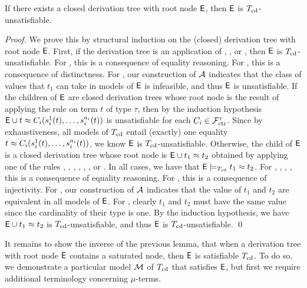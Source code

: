 \begin{lemma}%
\label{lem:rs}%
\afterDot
If there exists a closed derivation tree with root node $\mathsf{E}$, then $\mathsf{E}$ is $T_{\mathrm{cd}}$-unsatisfiable.
\end{lemma}
\begin{proof}
We prove this by structural induction on the (closed) derivation tree with root node $\mathsf{E}$.
First, if the derivation tree is an application of , , or ,
then $\mathsf{E}$ is $T_{\mathrm{cd}}$-unsatisfiable.
For , this is a consequence of equality reasoning.
For , this is a consequence of distinctness.
For , our construction of $\mathcal{A}$ indicates that the class of values that $t_1$ can take in models of $\mathsf{E}$ is infeasible,
and thus $\mathsf{E}$ is unsatisfiable.
If the children of $\mathsf{E}$ are closed derivation trees 
whose root node is the result of applying the rule  on term $t$ of type $\tau$,
then by the induction hypothesis $\mathsf{E} \cup t \approx C_i( s^1_i( t ), \ldots, s^{a_i}_i( t ) )$ is unsatisfiable
for each $C_i \in \mathcal{F}_{\mathrm{ctr}}^\tau$.
Since by exhaustiveness, all models of $T_{\mathrm{cd}}$ entail (exactly) one equality $t \approx C_i( s^1_i( t ), \ldots, s^{a_i}_i( t ) )$,
we know $\mathsf{E}$ is $T_{\mathrm{cd}}$-unsatisfiable.
Otherwise, the child of $\mathsf{E}$ is a closed derivation tree 
whose root node is $\mathsf{E} \cup t_1 \approx t_2$ obtained by applying one of the rules , , , , , , or .
In all cases, we have that $\mathsf{E} \models_{T_{\mathrm{cd}}} t_1 \approx t_2$.
For , , , , this is a consequence of equality reasoning.
For , this is a consequence of injectivity.
For , our construction of $\mathcal{A}$ indicates that the value of $t_1$ and $t_2$ are equivalent in all models of $\mathsf{E}$.
For , clearly $t_1$ and $t_2$ must have the same value since the cardinality of their type is one.
By the induction hypothesis, we have $\mathsf{E} \cup t_1 \approx t_2$ is $T_{\mathrm{cd}}$-unsatisfiable, 
and thus $\mathsf{E}$ is $T_{\mathrm{cd}}$-unsatisfiable.
\qed
\end{proof}

It remains to show the inverse of the previous lemma, that when a derivation tree with root node $\mathsf{E}$ contains a saturated node,
then $\mathsf{E}$ is satisfiable $T_{\mathrm{cd}}$.
To do so, we demonstrate a particular model $\mathcal{M}$ of $T_{\mathrm{cd}}$ that satisfies $\mathsf{E}$,
but first we require additional terminology concerning $\mu$-terms.

